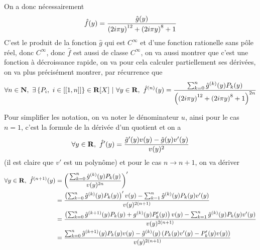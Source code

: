 \documentclass[a4paper,11pt, twoside]{article}
\title{}
\author{Raphaël Casanova}
\begin{document}
On a donc nécessairement 
$$\hat f(y)=\frac{\hat g(y)}{\left(2i\pi y \right)^{12}+\left(2i\pi y \right)^{8}+1}$$
C'est le produit de la fonction $\hat g$ qui est $C^\infty$ et d'une fonction rationelle sans pôle réel, donc $C^\infty$, donc $\hat f$ est aussi de classe $C^\infty$, on va aussi montrer que c'est une fonction à décroissance rapide, on va pour cela calculer partiellement ses dérivées, on va plus précisément montrer, par récurrence que 
$$\forall n\in\N,\ \exists \ens{P_i,\ i\in[[1,n]]}\in\R[X]\ |\ \forall y\in\R,\ \hat f^{(n)}(y)=\frac{\sum_{k=0}^n \hat g^{(k)}(y)P_k(y)}{\Par{\Par{2i\pi y }^{12}+\Par{2i\pi y }^{8}+1}^{2n}}$$

Pour simplifier les notation, on va noter le dénominateur $u$, ainsi pour le cas $n=1$, c'est la formule de la dérivée d'un quotient et on a 
$$\forall y\in\mathbf R,\ \hat f'(y)=\frac{\hat g'(y)v(y)-\hat g(y)v'(y)}{v(y)^2}$$
(il est claire que $v'$ est un polynôme) et pour le cas $n\to n+1$, on va dériver
\begin{align*}
	\forall y\in\mathbf R,\ \hat f^{(n+1)}(y)&=\left(\frac{\sum_{k=0}^n \hat g^{(k)}(y)P_k(y)}{v(y)^{2n}}\right)'\\
	&=\frac{\left(\sum_{k=0}^n \hat g^{(k)}(y)P_k(y)\right)'v(y)-\sum_{k=1}^n \hat g^{(k)}(y)P_k(y)v'(y)}{v(y)^{2(n+1)}}\\
	&=\frac{\left(\sum_{k=0}^n \hat g^{(k+1)}(y)P_k(y)+g^{(k)}(y)P'_k(y)\right)v(y)-\sum_{k=1}^n \hat g^{(k)}(y)P_k(y)v'(y)}{v(y)^{2(n+1)}}\\
	&=\frac{\sum_{k=0}^n \hat g^{(k+1)}(y)P_k(y)v(y)-\hat g^{(k)}(y)\left(P_k(y)v'(y)-P'_k(y)v(y)\right)}{v(y)^{2(n+1)}}
\end{align*}
\end{document}

